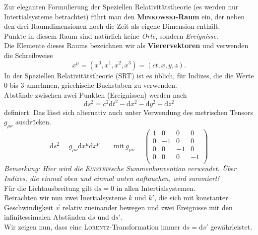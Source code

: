 Zur eleganten Formulierung der Speziellen Relativitätstheorie (es werden nur Intertialsysteme betrachtet) führt man den \textbf{\textsc{Minkowski}-Raum} ein, der neben den drei Raumdimensionen noch die Zeit als eigene Dimension enthält. \\
Punkte in diesem Raum sind natürlich keine \emph{Orte}, sondern \emph{Ereignisse}.\\
Die Elemente dieses Raums bezeichnen wir als \textbf{Vierervektoren} und verwenden die Schreibweise
\begin{equation*}
x^\mu = (x^0,x^1,x^2,x^3)=(ct,x,y,z).
\end{equation*}
In der Speziellen Relativitätstheorie (SRT) ist es üblich, für Indizes, die die Werte 0 bis 3 annehmen, griechische Buchstaben zu verwenden.\\

Abstände zwischen zwei Punkten (Ereignissen) werden nach
\begin{equation*}
\mathrm{d}s^2 = c^2\mathrm{d}t^2 -\mathrm{d}x^2 - \mathrm{d}y^2 - \mathrm{d}z^2 
\end{equation*}
definiert. Das lässt sich alternativ auch unter Verwendung des metrischen Tensors $g_{\mu\nu}$ ausdrücken.
\begin{equation*}
\mathrm{d}s^2 = g_{\mu\nu}\mathrm{d}x^\mu\mathrm{d}x^\nu \qquad \text{mit}\ g_{\mu\nu}=\begin{pmatrix}
1 & 0& 0 & 0 \\
0 &-1& 0 & 0\\
0 & 0 & -1 & 0 \\
0 & 0 & 0 & -1 \\
\end{pmatrix}
\end{equation*}
\emph{Bemerkung: Hier wird die \textsc{Einstein}sche Summenkonvention verwendet. Über Indizes, die einmal oben und einmal unten auftauchen, wird summiert!}\\

Für die Lichtausbreitung gilt $\mathrm{d}s=0$ in allen Intertialsystemen. \\
Betrachten wir nun zwei Inertialsysteme $k$ und $k'$, die sich mit konstanter Geschwindigkeit $\vec{v}$ relativ zueinander bewegen und zwei Ereignisse mit den infinitessimalen Abständen $\mathrm{d}s$ und $\mathrm{d}s'$. \\
Wir zeigen nun, dass eine \textsc{Lorentz}-Transformation immer $\mathrm{d}s=\mathrm{d}s'$ gewährleistet. \\

